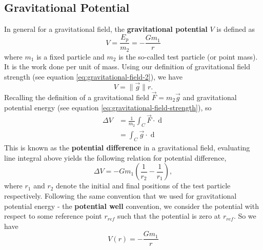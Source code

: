\subsection{Gravitational Potential}
In general for a gravitational field, the \textbf{gravitational potential} $V$ is defined as 
\begin{equation}
    V = \frac{E_p}{m_2} = - \frac{G m_1}{r}
\end{equation}
where $m_1$ is a fixed particle and $m_2$ is the so-called test particle (or point mass). It is the work done per unit of mass. Using our definition of gravitational field strength (see equation \ref{eq:gravitational-field-2}), we have
\begin{equation}
    V = \| \vec{g} \| r.
\end{equation}
Recalling the definition of a gravitational field $\vec{F} = m_2 \vec{g}$ and gravitational potential energy (see equation \ref{eq:gravitational-field-strength}), so
\begin{align}
    \Delta V &= \frac{1}{m_2} \int_C \vec{F} \cdot \mathop{\mathrm{d}\vec{r}} \\
    &= \int_C \vec{g} \cdot \mathop{\mathrm{d}\vec{r}}
\end{align}
This is known as the \textbf{potential difference} in a gravitational field, evaluating line integral above yields the following relation for potential difference,
\begin{equation}
    \Delta V = - G m_1 \left(\frac{1}{r_2} - \frac{1}{r_1}\right),
\end{equation}
where $r_1$ and $r_2$ denote the initial and final positions of the test particle respectively. Following the same convention that we used for gravitational potential energy - the \textbf{potential well} convention, we consider the potential with respect to some reference point $r_{ref}$ such that the potential is zero at $r_{ref}$. So we have
\begin{equation}
    V(r) = - \frac{G m_1}{r}
\end{equation}

